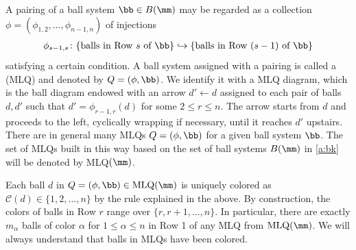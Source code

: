 A pairing of a ball system  $\bb \in B(\mm)$ may be regarded as a collection 
$\phi=(\phi_{1,2},\ldots, \phi_{n-1,n})$ of injections
\begin{align}\label{a:inj}
\phi_{s-1,s} \colon 
 \{ \text{balls in Row $s$ of $\bb$} \} \hookrightarrow \{ \text{balls in Row $(s-1)$ of $\bb$} \}
 \end{align}
satisfying a certain condition.
%
A ball system assigned with a pairing is called a  (MLQ) and 
denoted by $Q = (\phi, \bb)$.
We identify it with a MLQ diagram, which is the ball diagram endowed with an arrow $d' \leftarrow d$ assigned to 
each pair of balls $d, d'$ such that $d'=\phi_{r-1,r}(d)$ for some 
$2 \le r \le n$. 
The arrow starts from $d$ and proceeds to the left, cyclically wrapping if necessary, until it 
reaches $d'$ upstairs. 
There are in general many MLQs $Q = (\phi,\bb)$ for a given ball system $\bb$. 
The set of MLQs built in this way based on the set of ball systems $B(\mm)$ in 
\eqref{a:bk} will be denoted by MLQ$(\mm)$.

Each ball $d$ in $Q = (\phi,\bb) \in \text{MLQ}(\mm)$ is 
uniquely colored as $\mathcal{C}(d) \in \{1,2,\ldots, n\}$ by the rule explained in the above.
By construction, the colors of balls in Row $r$ range over $\{r, r+1, \ldots, n\}$.
In particular, there are exactly $m_\alpha$ balls of color $\alpha$ for $1 \le \alpha \le n$
in Row 1 of any MLQ from $\text{MLQ}(\mm)$.
We will always understand that balls in MLQs have been colored.
  
